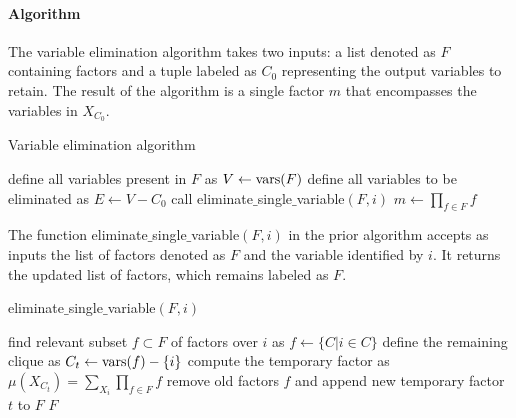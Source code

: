 \paragraph*{Algorithm}
The variable elimination algorithm takes two inputs: a list denoted as $F$ containing factors and a tuple labeled as $C_0$ representing the output variables to retain. 
The result of the algorithm is a single factor $m$ that encompasses the variables in $X_{C_0}$.
\begin{algorithm}[H]
    \caption{Variable elimination algorithm}
        \begin{algorithmic}[1]
            \State define all variables present in $F$ as $V\leftarrow\textnormal{vars}(F)$
            \State define all variables to be eliminated as $E\leftarrow V-C_0$
                \State call eliminate$\_$single$\_$variable$(F,i)$
            \EndFor
                \State $m \leftarrow \prod_{f \in F}f$
            \EndFor
        \end{algorithmic}
\end{algorithm}
The function eliminate$\_$single$\_$variable$(F,i)$ in the prior algorithm accepts as inputs the list of factors denoted as $F$ and the variable identified by $i$. 
It returns the updated list of factors, which remains labeled as $F$.
\begin{algorithm}[H]
    \caption{eliminate$\_$single$\_$variable$(F,i)$}
        \begin{algorithmic}[1]
            \State find relevant subset $f \subset F$ of factors over $i$ as $f \leftarrow\{C|i\in C\}$
            \State define the remaining clique as $C_t \leftarrow \textnormal{vars}(f)-\{i\}$
            \State compute the temporary factor as $\mu(X_{C_t})=\sum_{X_i}\prod_{f \in F}f$
            \State remove old factors $f$ and append new temporary factor $t$ to $F$
            \State \Return $F$
        \end{algorithmic}
\end{algorithm}
